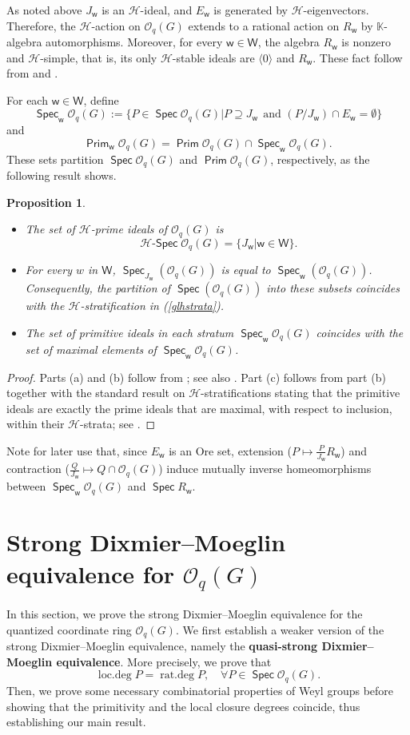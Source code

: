 \documentclass[11pt]{article}
\newtheorem{prop}[equation]{Proposition}
\theoremstyle{definition}
\numberwithin{equation}{section}
\newcommand{\KK}{\mathbb{K}}
\newcommand{\qu}{\mathcal{O}}
\newcommand{\Hf}{\mathcal{H}} %
\DeclareMathOperator{\rdeg}{\mathrm{rat.deg}}
\DeclareMathOperator{\ldeg}{\mathrm{loc.deg}}
\newcommand\W{\mathsf{W}}
\newcommand\w{\mathsf{w}}
\DeclareMathOperator{\spec}{\mathsf{Spec}}
\DeclareMathOperator{\hspec}{\Hf-\mathsf{Spec}}
\DeclareMathOperator{\Prim}{\mathsf{Prim}}
\begin{document}
	As noted above $J_{\w}$ is an $\Hf$-ideal, and $E_{\w}$ is generated by $\Hf$-eigenvectors. Therefore, the $\Hf$-action on $\qu_q(G)$ extends to a rational action on $R_{\w}$ by $\KK$-algebra automorphisms. Moreover, for every $\w\in\W$, the algebra $R_{\w}$ is nonzero and $\Hf$-simple, that is, its only $\Hf$-stable ideals  are $\langle 0 \rangle$ and $R_{\w}$. These fact follow from \cite[10.3.2]{JO95} and \cite[Corollary II.4.10]{BG02}. 
	
	For each $\w\in\W$, define 
	$$\spec_{\w}\qu_q(G):= \{P\in\spec\qu_q(G)| P\supseteq J_{\w} ~~ \text{and $(P/J_{\w})\cap E_{\w}= \emptyset$}\} $$
	and 
	$$\Prim_{\w}\qu_q(G)= \Prim\qu_q(G)\cap\spec_{\w}\qu_q(G).$$ 
These sets partition $\spec\qu_q(G)$ and $\Prim\qu_q(G)$, respectively, as the following result shows.
	\begin{prop}\label{hspecqug}
		\begin{itemize}
			\item[(a)] The set of $\Hf$-prime ideals of $\qu_q(G)$ is $$\hspec\qu_q(G)= \{J_{\w}| \w\in\W\}.$$
			\item[(b)] For every $w$ in $\W$, $\spec_{J_{\w}}(\qu_q(G))$ is equal to $\spec_{\w}(\qu_q(G))$. Consequently, the partition of $\spec(\qu_q(G))$ into these subsets coincides with the $\Hf$-stratification in (\ref{glhstrata}). 
			\item[(c)] The set of primitive ideals in each stratum $\spec_{\w}\qu_q(G)$ coincides with the set of maximal elements of $\spec_{\w} \qu_q(G)$. 
		\end{itemize}
	\end{prop}
	\begin{proof}
		Parts (a) and (b) follow from \cite[Theorem 2.1] {YA14}; see also \cite[Proposition II.4.11, Corollary II.4.12]{BG02}. Part (c) follows from part (b) together with the standard result on $\Hf$-stratifications stating that the primitive ideals are exactly the prime ideals that are maximal, with respect to inclusion, within their $\Hf$-strata; see \cite[Corollary 6.9]{GL00}. 
	\end{proof}
	
	Note for later use that, since $E_{\w}$ is an Ore set, extension ($P\mapsto \frac{P}{J_{\w}}R_{\w}$) and contraction ($\frac{Q}{J_{\w}}\mapsto Q\cap\qu_q(G)$) induce mutually inverse homeomorphisms between $\spec_{\w}\qu_q(G)$ and $\spec R_{\w}$.  

	
	
	
	\section{Strong Dixmier--Moeglin equivalence for $\qu_q(G)$}\label{sdmeqg}
	In this section, we prove the strong Dixmier--Moeglin equivalence for the quantized coordinate ring $\qu_q(G)$. We first establish a weaker version of the strong Dixmier–Moeglin equivalence, namely the \textbf{quasi-strong Dixmier--Moeglin equivalence}. More precisely, we prove that
	$$\ldeg P= \rdeg P,\quad\forall P\in \spec\qu_q(G).$$
	Then, we prove some necessary combinatorial properties of Weyl groups before showing that the primitivity and the local closure degrees coincide, thus establishing our main result. 	
\end{document}
